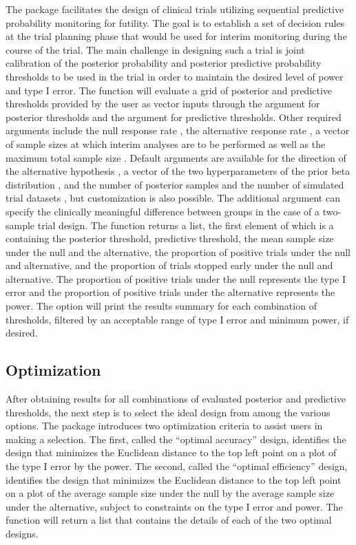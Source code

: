 The  package facilitates the design of clinical trials
utilizing sequential predictive probability monitoring for futility. The
goal is to establish a set of decision rules at the trial planning phase
that would be used for interim monitoring during the course of the
trial. The main challenge in designing such a trial is joint calibration
of the posterior probability and posterior predictive probability
thresholds to be used in the trial in order to maintain the desired
level of power and type I error. The 
function will evaluate a grid of posterior and predictive thresholds
provided by the user as vector inputs through the argument
 for posterior thresholds and the argument
 for predictive thresholds. Other required
arguments include the null response rate , the alternative
response rate , a vector of sample sizes at which interim
analyses are to be performed  as well as the maximum total
sample size . Default arguments are available for the direction
of the alternative hypothesis , a vector of the two
hyperparameters of the prior beta distribution , and the
number of posterior samples  and the number of simulated trial
datasets , but customization is also possible. The additional
argument  can specify the clinically meaningful difference
between groups in the case of a two-sample trial design. The function
returns a list, the first element of which is a  containing
the posterior threshold, predictive threshold, the mean sample size
under the null and the alternative, the proportion of positive trials
under the null and alternative, and the proportion of trials stopped
early under the null and alternative. The proportion of positive trials
under the null represents the type I error and the proportion of
positive trials under the alternative represents the power. The
 option will print the results summary for each
combination of thresholds, filtered by an acceptable range of type I
error and minimum power, if desired.

\hypertarget{optimization}{%
\subsection{Optimization}\label{optimization}}

After obtaining results for all combinations of evaluated posterior and
predictive thresholds, the next step is to select the ideal design from
among the various options. The  package introduces two
optimization criteria to assist users in making a selection. The first,
called the ``optimal accuracy'' design, identifies the design that
minimizes the Euclidean distance to the top left point on a plot of the
type I error by the power. The second, called the ``optimal efficiency''
design, identifies the design that minimizes the Euclidean distance to
the top left point on a plot of the average sample size under the null
by the average sample size under the alternative, subject to constraints
on the type I error and power. The  function
will return a list that contains the details of each of the two optimal
designs.

